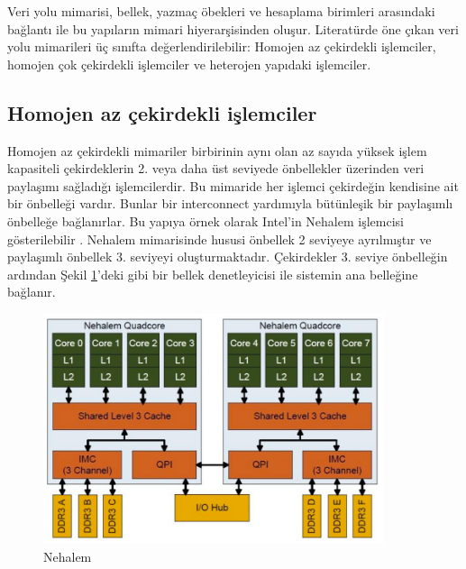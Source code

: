 Veri yolu mimarisi, bellek, yazmaç öbekleri ve hesaplama birimleri arasındaki bağlantı ile bu yapıların mimari hiyerarşisinden oluşur. Literatürde öne çıkan veri yolu mimarileri üç sınıfta değerlendirilebilir: Homojen az çekirdekli işlemciler, homojen çok çekirdekli işlemciler ve heterojen yapıdaki işlemciler. \par

\subsection{Homojen az çekirdekli işlemciler}
Homojen az çekirdekli mimariler birbirinin aynı olan az sayıda yüksek işlem kapasiteli çekirdeklerin 2. veya daha üst seviyede önbellekler üzerinden veri paylaşımı sağladığı işlemcilerdir. Bu mimaride her işlemci çekirdeğin kendisine ait bir önbelleği vardır. Bunlar bir interconnect yardımıyla bütünleşik bir paylaşımlı önbelleğe bağlanırlar. Bu yapıya örnek olarak Intel'in Nehalem işlemcisi gösterilebilir \cite{molka2009memory} \cite{hackenberg2009comparing}. Nehalem mimarisinde hususi önbellek 2 seviyeye ayrılmıştır ve paylaşımlı önbellek 3. seviyeyi oluşturmaktadır. Çekirdekler 3. seviye önbelleğin ardından Şekil \ref{image:nehalem}'deki gibi bir bellek denetleyicisi ile sistemin ana belleğine bağlanır.\par

\begin{figure}[h] \label{image:nehalem} 
\centering \includegraphics[width=10cm]{gorsel/nehalem.jpg} \caption{Nehalem}  
\end{figure}

